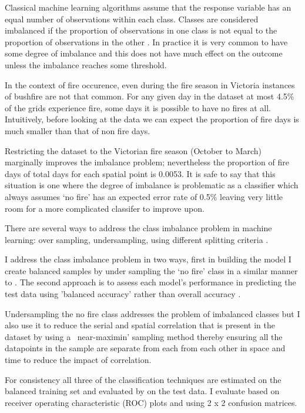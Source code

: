 \documentclass[11pt,a4paper]{article}
\begin{document}
Classical machine learning algorithms assume that the response variable has an equal number of observations within each class. Classes are considered imbalanced if the proportion of observations in one class is not equal to the proportion of observations in the other \citep{japkowicz00}. In practice it is very common to have some degree of imbalance and this does not have much effect on the outcome unless the imbalance reaches some threshold. 

In the context of fire occurence, even during the fire season in Victoria instances of bushfire are not that common. For any given day in the dataset at most 4.5\% of the grids experience fire, some days it is possible to have no fires at all. Intuitively, before looking at the data we can expect the proportion of fire days is much smaller than that of non fire days. 

Restricting the dataset to the Victorian fire season (October to March) marginally improves the imbalance problem; nevertheless the proportion of fire days of total days for each spatial point is 0.0053. It is safe to say that this situation is one where the degree of imbalance is problematic as a classifier which always assumes `no fire' has an expected error rate of 0.5\% leaving very little room for a more complicated classifer to improve upon. 

There are several ways to address the class imbalance problem in machine learning: over sampling, undersampling, using different splitting criteria \citep{japkowicz00}. 

I address the class imbalance problem in two ways, first in building the model I create balanced samples by under sampling the `no fire' class in a similar manner to \citep{padilla11}.  The second approach is to assess each model's performance in predicting the test data using 'balanced accuracy' rather than overall accuracy \citep{mosley13, japkowicz00}. 

Undersampling the no fire class addresses the problem of imbalanced classes but I also use it to reduce the serial and spatial correlation that is present in the dataset by using a ~near-maximin' sampling method thereby ensuring all the datapoints in the sample are separate from each from each other in space and time to reduce the impact of correlation. 

For consistency all three of the classification techniques are estimated on the balanced training set and evaluated by  on the test data. I evaluate based on receiver operating characteristic (ROC) plots  and using 2 x 2 confusion matrices. 
\end{document}
